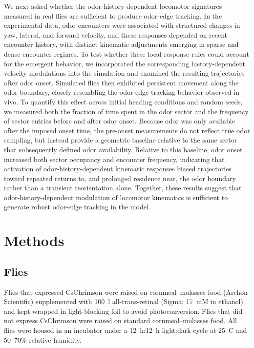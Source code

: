 We next asked whether the odor-history-dependent locomotor signatures measured in real flies are sufficient to produce odor-edge tracking. In the experimental data, odor encounters were associated with structured changes in yaw, lateral, and forward velocity, and these responses depended on recent encounter history, with distinct kinematic adjustments emerging in sparse and dense encounter regimes. To test whether these local response rules could account for the emergent behavior, we incorporated the corresponding history-dependent velocity modulations into the simulation and examined the resulting trajectories after odor onset. Simulated flies then exhibited persistent movement along the odor boundary, closely resembling the odor-edge tracking behavior observed in vivo. To quantify this effect across initial heading conditions and random seeds, we measured both the fraction of time spent in the odor sector and the frequency of sector entries before and after odor onset. Because odor was only available after the imposed onset time, the pre-onset measurements do not reflect true odor sampling, but instead provide a geometric baseline relative to the same sector that subsequently defined odor availability. Relative to this baseline, odor onset increased both sector occupancy and encounter frequency, indicating that activation of odor-history-dependent kinematic responses biased trajectories toward repeated returns to, and prolonged residence near, the odor boundary rather than a transient reorientation alone. Together, these results suggest that odor-history-dependent modulation of locomotor kinematics is sufficient to generate robust odor-edge tracking in the model.

\section{Methods}

\subsection{Flies}

Flies that expressed CsChrimson were raised on cornmeal--molasses food (Archon Scientific) supplemented with 100~\textmu l all-trans-retinal (Sigma; 17~mM in ethanol) and kept wrapped in light-blocking foil to avoid photoconversion. Flies that did not express CsChrimson were raised on standard cornmeal--molasses food. All flies were housed in an incubator under a 12~h:12~h light:dark cycle at 25~\textdegree C and 50--70\% relative humidity.

